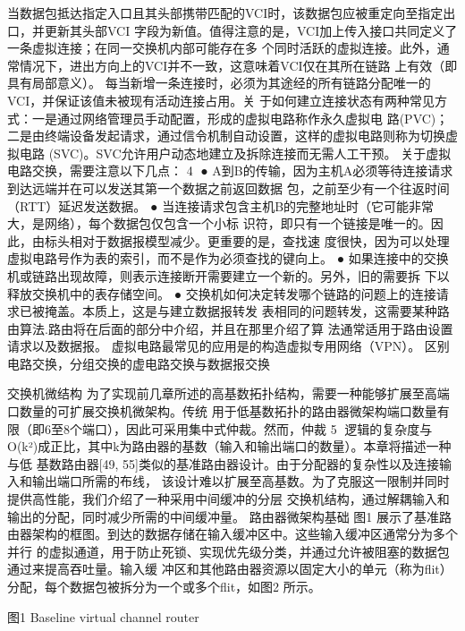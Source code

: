 当数据包抵达指定入口且其头部携带匹配的VCI时，该数据包应被重定向至指定出口，并更新其头部VCI
字段为新值。值得注意的是，VCI加上传入接口共同定义了一条虚拟连接；在同一交换机内部可能存在多
个同时活跃的虚拟连接。此外，通常情况下，进出方向上的VCI并不一致，这意味着VCI仅在其所在链路
上有效（即具有局部意义）。
每当新增一条连接时，必须为其途经的所有链路分配唯一的VCI，并保证该值未被现有活动连接占用。关
于如何建立连接状态有两种常见方式：一是通过网络管理员手动配置，形成的虚拟电路称作永久虚拟电
路(PVC)；二是由终端设备发起请求，通过信令机制自动设置，这样的虚拟电路则称为切换虚拟电路
(SVC)。SVC允许用户动态地建立及拆除连接而无需人工干预。
关于虚拟电路交换，需要注意以下几点：
                                                 4
●  A到B的传输，因为主机A必须等待连接请求到达远端并在可以发送其第一个数据之前返回数据
   包，之前至少有一个往返时间（RTT）延迟发送数据。
 ● 当连接请求包含主机B的完整地址时（它可能非常大，是网络），每个数据包仅包含一个小标
   识符，即只有一个链接是唯一的。因此，由标头相对于数据报模型减少。更重要的是，查找速
   度很快，因为可以处理虚拟电路号作为表的索引，而不是作为必须查找的键向上。
 ● 如果连接中的交换机或链路出现故障，则表示连接断开需要建立一个新的。另外，旧的需要拆
   下以释放交换机中的表存储空间。
 ● 交换机如何决定转发哪个链路的问题上的连接请求已被掩盖。本质上，这是与建立数据报转发
   表相同的问题转发，这需要某种路由算法.路由将在后面的部分中介绍，并且在那里介绍了算
   法通常适用于路由设置请求以及数据报。
虚拟电路最常见的应用是的构造虚拟专用网络（VPN）。
区别电路交换，分组交换的虚电路交换与数据报交换




交换机微结构
为了实现前几章所述的高基数拓扑结构，需要一种能够扩展至高端口数量的可扩展交换机微架构。传统
用于低基数拓扑的路由器微架构端口数量有限（即6至8个端口），因此可采用集中式仲裁。然而，仲裁
                                                 5
逻辑的复杂度与O(k²)成正比，其中k为路由器的基数（输入和输出端口的数量）。本章将描述一种与低
基数路由器[49, 55]类似的基准路由器设计。由于分配器的复杂性以及连接输入和输出端口所需的布线，
该设计难以扩展至高基数。为了克服这一限制并同时提供高性能，我们介绍了一种采用中间缓冲的分层
交换机结构，通过解耦输入和输出的分配，同时减少所需的中间缓冲量。
路由器微架构基础
图1 展示了基准路由器架构的框图。到达的数据存储在输入缓冲区中。这些输入缓冲区通常分为多个并行
的虚拟通道，用于防止死锁、实现优先级分类，并通过允许被阻塞的数据包通过来提高吞吐量。输入缓
冲区和其他路由器资源以固定大小的单元（称为flit）分配，每个数据包被拆分为一个或多个flit，如图2
所示。




图1 Baseline virtual channel router




